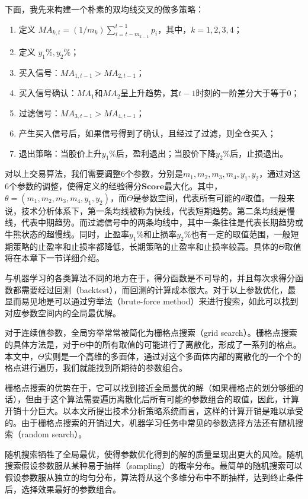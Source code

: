 \documentclass[twoside,longtitle]{LZUthesis}
\begin{document}
下面，我先来构建一个朴素的双均线交叉的做多策略：
\begin{enumerate}
	\item 定义 $MA_{k,t}=(1/m_k)\sum_{i=t-m_{k-1}}^{t-1}p_i $，其中，$k=1,2,3,4$；
	\item 定义 $y_1\%, y_2\%$；
	\item 买入信号：$MA_{1,t-1}>MA_{2,t-1}$；
	\item 买入信号确认：$MA_1$和$MA_2$呈上升趋势，其$t-1$时刻的一阶差分大于等于0；
	\item 过滤信号：$MA_{3,t-1}>MA_{4,t-1}$；
	\item 产生买入信号后，如果信号得到了确认，且经过了过滤，则全仓买入；
	\item 退出策略：当股价上升$y_1\%$后，盈利退出；当股价下降$y_2\%$后，止损退出。
\end{enumerate}

对以上交易算法，我们需要调整6个参数，分别是$m_1,m_2,m_3,m_4,y_1,y_2$，通过对这6个参数的调整，使得定义的经验得分$\mathbf{Score}$最大化。其中，$\theta=(m_1,m_2,m_3,m_4,y_1,y_2)$，而$\Theta$是参数空间，代表所有可能的$\theta$取值。一般来说，技术分析体系下，第一条均线被称为快线，代表短期趋势。第二条均线是慢线，代表中期趋势。而过滤信号中的两条均线中，其中一条往往是代表长期趋势或牛熊状态的超慢线。同时，止盈率$y_1\%$和止损率$y_2\%$也有一定的取值范围，一般短期策略的止盈率和止损率都降低，长期策略的止盈率和止损率较高。具体的$\Theta$取值将在本章下一节详细介绍。

与机器学习的各类算法不同的地方在于，得分函数是不可导的，并且每次求得分函数都需要经过回测（backtest），而回测的计算成本很大。对于以上参数优化，最显而易见地是可以通过穷举法（brute-force method）来进行搜索，如此可以找到对应参数空间内的全局最优解。

对于连续值参数，全局穷举常常被简化为栅格点搜索（grid search）。栅格点搜索的具体方法是，对于$\Theta$中的所有取值的可能进行了离散化，形成了一系列的格点。本文中，$\Theta$实则是一个高维的多面体，通过对这个多面体内部的离散化的一个个的格点进行遍历，我们就能找到所期待的参数组合。

栅格点搜索的优势在于，它可以找到接近全局最优的解（如果栅格点的划分够细的话），但由于这个算法需要遍历离散化后所有可能的参数组合的取值，因此，计算开销十分巨大。以本文所提出技术分析策略系统而言，这样的计算开销是难以承受的。由于栅格点搜索的开销过大，机器学习任务中常见的参数选择方法还有随机搜索（random search）。

随机搜索牺牲了全局最优，使得参数优化得到的解的质量呈现出更大的风险。随机搜索假设参数服从某种易于抽样（sampling）的概率分布。最简单的随机搜索可以假设参数服从独立的均匀分布，算法将从这个多维分布中不断抽样，达到终止条件后，选择效果最好的参数组合。
\end{document}
